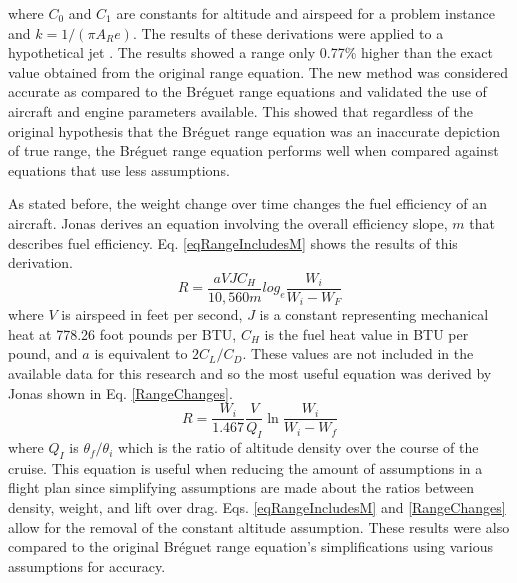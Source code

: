 where $C_0$ and $C_1$ are constants for altitude and airspeed for a problem instance and $k = 1/(\pi A_R e)$. The results of these derivations were applied to a hypothetical jet \cite{Jonas}. The results showed a range only 0.77\% higher than the exact value obtained from the original range equation. The new method was considered accurate as compared to the Br\'eguet range equations and validated the use of aircraft and engine parameters available. This showed that regardless of the original hypothesis that the Br\'eguet range equation was an inaccurate depiction of true range, the Br\'eguet range equation performs well when compared against equations that use less assumptions.\par
As stated before, the weight change over time changes the fuel efficiency of an aircraft. Jonas \cite{Jonas} derives an equation involving the overall efficiency slope, $m$ that describes fuel efficiency. Eq. \ref{eqRangeIncludesM} shows the results of this derivation.
\begin{equation}
    R = \dfrac{aVJC_H}{10,560m}log_e\dfrac{W_i}{W_i-W_F}
    \label{eqRangeIncludesM}
\end{equation}
where $V$ is airspeed in feet per second, $J$ is a constant representing mechanical heat at 778.26 foot pounds per BTU, $C_H$ is the fuel heat value in BTU per pound, and $a$ is equivalent to $2C_L/C_D$. These values are not included in the available data for this research and so the most useful equation was derived by Jonas \cite{Jonas} shown in Eq. \ref{RangeChanges}.
\begin{equation}
    R = \dfrac{W_i}{1.467}\dfrac{V}{Q_I}\ln\dfrac{W_i}{W_i-W_f}
    \label{RangeChanges}
\end{equation}
where $Q_I$ is $\theta_f/\theta_i$ which is the ratio of altitude density over the course of the cruise. This equation is useful when reducing the amount of assumptions in a flight plan since simplifying assumptions are made about the ratios between density, weight, and lift over drag. Eqs. \ref{eqRangeIncludesM} and \ref{RangeChanges} allow for the removal of the constant altitude assumption. These results were also compared to the original Br\'eguet range equation's simplifications using various assumptions for accuracy. \par
